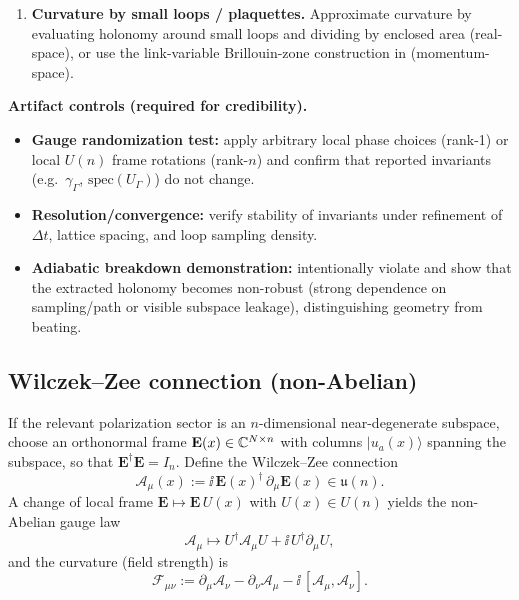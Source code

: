 \begin{center}
{\begin{minipage}{0.95\linewidth}
\begin{enumerate}
\item \textbf{Curvature by small loops / plaquettes.}
Approximate curvature by evaluating holonomy around small loops and dividing by enclosed area (real-space),
or use the link-variable Brillouin-zone construction in  (momentum-space).
\end{enumerate}

\textbf{Artifact controls (required for credibility).}
\begin{itemize}
\item \textbf{Gauge randomization test:} apply arbitrary local phase choices (rank-1) or local $U(n)$ frame rotations (rank-$n$) and
confirm that reported invariants (e.g.\ $\gamma_\Gamma$, $\mathrm{spec}(U_\Gamma)$) do not change.
\item \textbf{Resolution/convergence:} verify stability of invariants under refinement of $\Delta t$, lattice spacing, and loop sampling density.
\item \textbf{Adiabatic breakdown demonstration:} intentionally violate  and show that the extracted holonomy
becomes non-robust (strong dependence on sampling/path or visible subspace leakage), distinguishing geometry from beating.
\end{itemize}
\end{minipage}}
\end{center}

\subsection{Wilczek--Zee connection (non-Abelian)}

If the relevant polarization sector is an $n$-dimensional near-degenerate subspace, choose an orthonormal
frame $\mathbf{E}(x)\in\mathbb{C}^{N\times n}$ with columns $\lvert u_a(x)\rangle$ spanning the subspace, so that
$\mathbf{E}^\dagger\mathbf{E}=I_n$.
Define the Wilczek--Zee connection
\begin{equation}
  \mathcal{A}_\mu(x) := \ii\,\mathbf{E}(x)^\dagger\,\partial_\mu \mathbf{E}(x)\in\mathfrak{u}(n).
  \label{eq:wz-connection}
\end{equation}
A change of local frame $\mathbf{E}\mapsto \mathbf{E}\,U(x)$ with $U(x)\in U(n)$ yields the non-Abelian gauge law
\begin{equation}
  \mathcal{A}_\mu \mapsto U^\dagger \mathcal{A}_\mu U + \ii\,U^\dagger \partial_\mu U,
  \label{eq:wz-gauge}
\end{equation}
and the curvature (field strength) is
\begin{equation}
  \mathcal{F}_{\mu\nu}
  := \partial_\mu \mathcal{A}_\nu-\partial_\nu \mathcal{A}_\mu
     -\ii\,[\mathcal{A}_\mu,\mathcal{A}_\nu].
  \label{eq:wz-curvature}
\end{equation}

